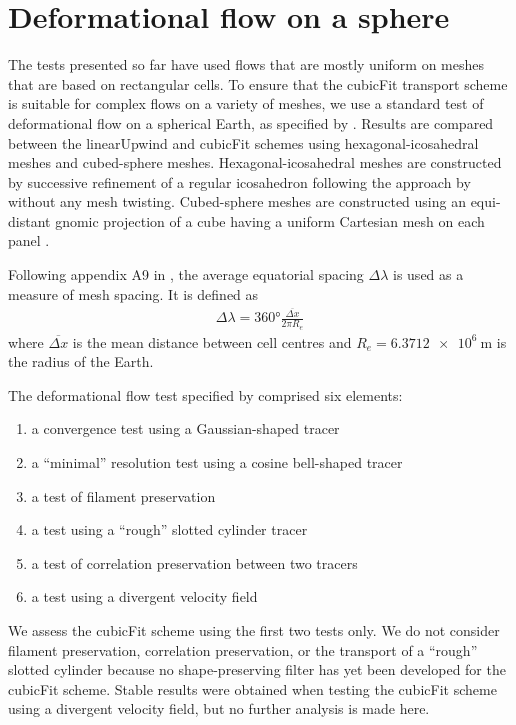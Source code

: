 \section{Deformational flow on a sphere}
\label{sec:cubicFit:deformationSphere}

The tests presented so far have used flows that are mostly uniform on meshes that are based on rectangular cells.
To ensure that the cubicFit transport scheme is suitable for complex flows on a variety of meshes, we use a standard test of deformational flow on a spherical Earth, as specified by \citet{lauritzen2012}.  
Results are compared between the linearUpwind and cubicFit schemes using hexagonal-icosahedral meshes and cubed-sphere meshes.
Hexagonal-icosahedral meshes are constructed by successive refinement of a regular icosahedron following the approach by \citet{thuburn2014,heikes-randall1995a,heikes-randall1995b} without any mesh twisting.
Cubed-sphere meshes are constructed using an equi-distant gnomic projection of a cube having a uniform Cartesian mesh on each panel \citep{staniforth-thuburn2012}.

Following appendix A9 in \citet{lauritzen2014}, the average equatorial spacing $\Delta \lambda$ is used as a measure of mesh spacing.  It is defined as
\begin{align}
	\Delta \lambda = \ang{360} \frac{\overline{\Delta x}}{2 \pi R_e}
\end{align}
where $\overline{\Delta x}$ is the mean distance between cell centres and $R_e = \SI{6.3712e6}{\meter}$ is the radius of the Earth.

The deformational flow test specified by \citet{lauritzen2012} comprised six elements:
\begin{enumerate}
\item a convergence test using a Gaussian-shaped tracer
\item a ``minimal'' resolution test using a cosine bell-shaped tracer
\item a test of filament preservation
\item a test using a ``rough'' slotted cylinder tracer
\item a test of correlation preservation between two tracers
\item a test using a divergent velocity field
\end{enumerate}
We assess the cubicFit scheme using the first two tests only.  We do not consider filament preservation, correlation preservation, or the transport of a ``rough'' slotted cylinder because no shape-preserving filter has yet been developed for the cubicFit scheme.  Stable results were obtained when testing the cubicFit scheme using a divergent velocity field, but no further analysis is made here.

